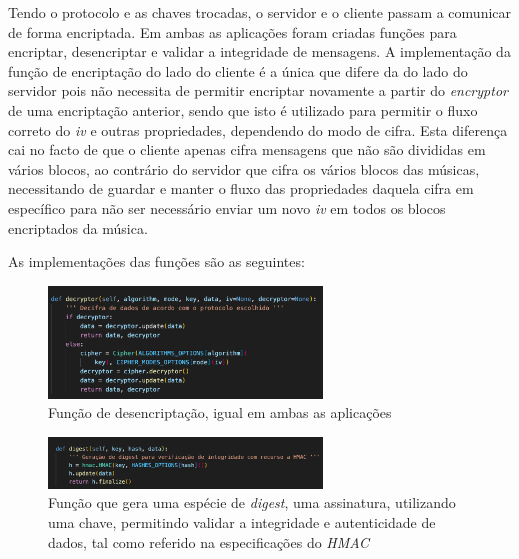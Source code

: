\documentclass[10pt,english]{article}
\begin{document}
\par Tendo o protocolo e as chaves trocadas, o servidor e o cliente passam a comunicar de forma encriptada. Em ambas as aplicações foram criadas funções para encriptar, desencriptar e validar a integridade de mensagens. A implementação da função de encriptação do lado do cliente é a única que difere da do lado do servidor pois não necessita de permitir encriptar novamente a partir do \textit{encryptor} de uma encriptação anterior, sendo que isto é utilizado para permitir o fluxo correto do \textit{iv} e outras propriedades, dependendo do modo de cifra. Esta diferença cai no facto de que o cliente apenas cifra mensagens que não são divididas em vários blocos, ao contrário do servidor que cifra os vários blocos das músicas, necessitando de guardar e manter o fluxo das propriedades daquela cifra em específico para não ser necessário enviar um novo \textit{iv} em todos os blocos encriptados da música.


\par As implementações das funções são as seguintes:

\begin{figure}[!h]
        \centering
        \includegraphics[width=275]{images/decryptor.png}
        \caption{Função de desencriptação, igual em ambas as aplicações}
\end{figure}

\begin{figure}[!h]
        \centering
        \includegraphics[width=275]{images/digest.png}
        \caption{Função que gera uma espécie de \textit{digest}, uma assinatura, utilizando uma chave, permitindo validar a integridade e autenticidade de dados, tal como referido na especificações do \textit{HMAC}}
\end{figure}
\end{document}
